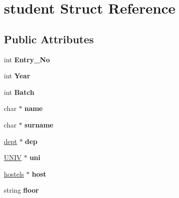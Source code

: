 \hypertarget{structstudent}{\section{student \-Struct \-Reference}
\label{structstudent}
}
\subsection*{\-Public \-Attributes}
\begin{DoxyCompactItemize}
\item 
\hypertarget{structstudent_aa7c812ed4b83c4e128dbe53afbadcef8}{int {\bfseries \-Entry\-\_\-\-No}}\label{structstudent_aa7c812ed4b83c4e128dbe53afbadcef8}

\item 
\hypertarget{structstudent_a342b6947ab8d9252427c723323417f6a}{int {\bfseries \-Year}}\label{structstudent_a342b6947ab8d9252427c723323417f6a}

\item 
\hypertarget{structstudent_ae6f48208eb22ab99175a88aa052a81a5}{int {\bfseries \-Batch}}\label{structstudent_ae6f48208eb22ab99175a88aa052a81a5}

\item 
\hypertarget{structstudent_a473ea91ecf604c0a5125eaad19307a39}{char $\ast$ {\bfseries name}}\label{structstudent_a473ea91ecf604c0a5125eaad19307a39}

\item 
\hypertarget{structstudent_ab20dcce0bdaf90e4a76f524271ac6e1d}{char $\ast$ {\bfseries surname}}\label{structstudent_ab20dcce0bdaf90e4a76f524271ac6e1d}

\item 
\hypertarget{structstudent_a7446b103a3a493593520b10614f0f763}{\hyperlink{structdept}{dept} $\ast$ {\bfseries dep}}\label{structstudent_a7446b103a3a493593520b10614f0f763}

\item 
\hypertarget{structstudent_ac34936881873c525c9c7714f3d5b8ffb}{\hyperlink{structUNIV}{\-U\-N\-I\-V} $\ast$ {\bfseries uni}}\label{structstudent_ac34936881873c525c9c7714f3d5b8ffb}

\item 
\hypertarget{structstudent_aff01da6822cee0fe566b4f737eaf144d}{\hyperlink{structhostels}{hostels} $\ast$ {\bfseries host}}\label{structstudent_aff01da6822cee0fe566b4f737eaf144d}

\item 
\hypertarget{structstudent_aab75abb4c4efa7e1539995b649adaa56}{string {\bfseries floor}}\label{structstudent_aab75abb4c4efa7e1539995b649adaa56}


\end{DoxyCompactItemize}
